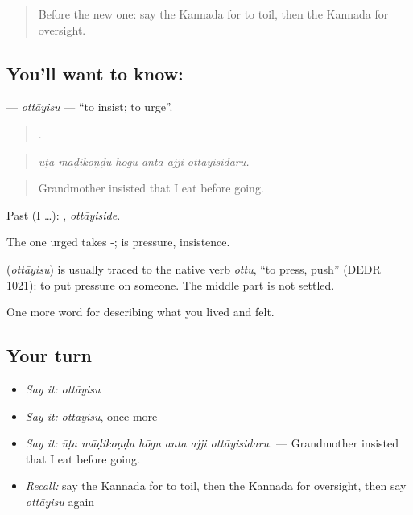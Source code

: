 \label{lesson:KA-C521-ottayisu}



\begin{quote}
Before the new one: say the Kannada for to toil, then the Kannada for oversight.
\end{quote}

\subsection*{You'll want to know: }
\textbf{} — \emph{ottāyisu} — \textquotedblleft{}to insist; to urge\textquotedblright{}.

\begin{quote}
     .
\end{quote}

\begin{quote}
\emph{ūṭa māḍikoṇḍu hōgu anta ajji ottāyisidaru.}
\end{quote}

\begin{quote}
Grandmother insisted that I eat before going.
\end{quote}

Past (I …): , \emph{ottāyiside}.

The one urged takes -;  is pressure, insistence.

\begin{cousinweb}
\textbf{} (\emph{ottāyisu}) is usually traced to the native verb \emph{ottu}, \textquotedblleft{}to press, push\textquotedblright{} (DEDR 1021): to put pressure on someone. The middle part is not settled.
\end{cousinweb}

\begin{grammarlens}[title={What you've built}]
One more word for describing what you lived and felt.
\end{grammarlens}

\subsection*{Your turn}
\begin{itemize}
\raggedright
  \item \emph{Say it:} \emph{ottāyisu}
  \item \emph{Say it:} \emph{ottāyisu}, once more
  \item \emph{Say it:} \emph{ūṭa māḍikoṇḍu hōgu anta ajji ottāyisidaru.} — Grandmother insisted that I eat before going.
  \item \emph{Recall:} say the Kannada for to toil, then the Kannada for oversight, then say \emph{ottāyisu} again
\end{itemize}


